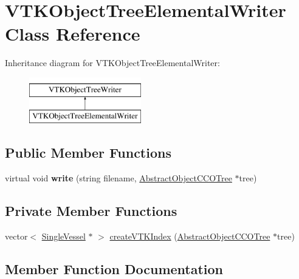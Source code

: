 \hypertarget{class_v_t_k_object_tree_elemental_writer}{}\section{V\+T\+K\+Object\+Tree\+Elemental\+Writer Class Reference}
\label{class_v_t_k_object_tree_elemental_writer}
Inheritance diagram for V\+T\+K\+Object\+Tree\+Elemental\+Writer\+:\begin{figure}[H]
\begin{center}
\leavevmode
\includegraphics[height=2.000000cm]{dc/d27/class_v_t_k_object_tree_elemental_writer}
\end{center}
\end{figure}
\subsection*{Public Member Functions}
\begin{DoxyCompactItemize}
\item 
virtual void {\bfseries write} (string filename, \hyperlink{class_abstract_object_c_c_o_tree}{Abstract\+Object\+C\+C\+O\+Tree} $\ast$tree)\hypertarget{class_v_t_k_object_tree_elemental_writer_a23e1b460170169b56fe46923e134ec27}{}\label{class_v_t_k_object_tree_elemental_writer_a23e1b460170169b56fe46923e134ec27}

\end{DoxyCompactItemize}
\subsection*{Private Member Functions}
\begin{DoxyCompactItemize}
\item 
vector$<$ \hyperlink{class_single_vessel}{Single\+Vessel} $\ast$ $>$ \hyperlink{class_v_t_k_object_tree_elemental_writer_a79259a15da0c99f2851b468b0c90243e}{create\+V\+T\+K\+Index} (\hyperlink{class_abstract_object_c_c_o_tree}{Abstract\+Object\+C\+C\+O\+Tree} $\ast$tree)
\end{DoxyCompactItemize}


\subsection{Member Function Documentation}
